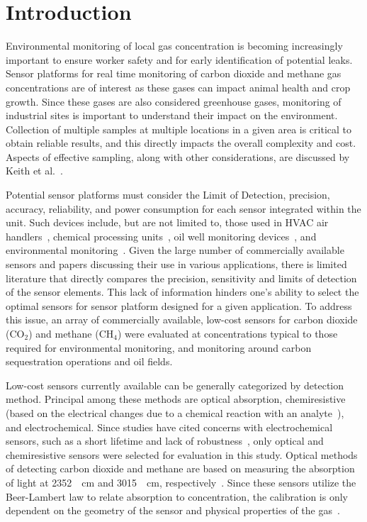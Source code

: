\documentclass[preprint,sort&compress]{elsarticle}
\begin{document}
	\newpage
	
	\section{Introduction}
	\label{sec:intro}
		
		Environmental monitoring of local gas concentration is becoming increasingly important to ensure worker safety and for early identification of potential leaks.  Sensor platforms for real time monitoring of carbon dioxide and methane gas concentrations are of interest as these gases can impact animal health and crop growth.  Since these gases are also considered greenhouse gases, monitoring of industrial sites is important to understand their impact on the environment.  Collection of multiple samples at multiple locations in a given area is critical to obtain reliable results, and this directly impacts the overall complexity and cost.  Aspects of effective sampling, along with other considerations, are discussed by Keith et al.~\cite{keith_principles_1983}.
		
		Potential sensor platforms must consider the Limit of Detection, precision, accuracy, reliability, and power consumption for each sensor integrated within the unit.  Such devices include, but are not limited to, those used in HVAC air handlers~\cite{yang_systematic_2014,chung_selective_2008}, chemical processing units~\cite{won_nonlinear_2012}, oil well monitoring devices~\cite{yi_remote_2010,somov_deployment_2013}, and environmental monitoring~\cite{pering_high_2014,black_formation_2012,guohua_study_2012,karunanithi_performance_2009,shendell_outdoor_2012}.  Given the large number of commercially available sensors and papers discussing their use in various applications, there is limited literature that directly compares the precision, sensitivity and limits of detection of the sensor elements.  This lack of information hinders one's ability to select the optimal sensors for sensor platform designed for a given application.  To address this issue, an array of commercially available, low-cost sensors for carbon dioxide (CO$_2$) and methane (CH$_4$) were evaluated at concentrations typical to those required for environmental monitoring, and monitoring around carbon sequestration operations and oil fields.
		
		Low-cost sensors currently available can be generally categorized by detection method.  Principal among these methods are optical absorption, chemiresistive (based on the electrical changes due to a chemical reaction with an analyte~\cite{wetchakun_semiconducting_2011}), and electrochemical.  Since studies have cited concerns with electrochemical sensors, such as a short lifetime and lack of robustness~\cite{neri_first_2015}, only optical and chemiresistive sensors were selected for evaluation in this study.  Optical methods of detecting carbon dioxide and methane are based on measuring the absorption of light at \SI{2352}{\per\centi\meter} and \SI{3015}{\per\centi\meter}, respectively~\cite{frodl_high-precision_2006,zhu_one_2012}.  Since these sensors utilize the Beer-Lambert law to relate absorption to concentration, the calibration is only dependent on the geometry of the sensor and physical properties of the gas~\cite{bacsik_ftir_2004}.  
		
\end{document}
